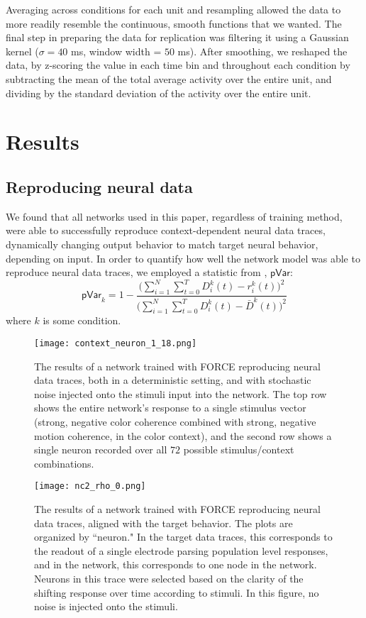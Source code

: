\documentclass[12pt,a4paper,final]{iopart}
\begin{document}
Averaging across conditions for each unit and resampling allowed the data to more readily resemble the continuous, smooth functions that we wanted. The final step in preparing the data for replication was filtering it using a Gaussian kernel ($\sigma = 40$ ms, window width = $50$ ms). After smoothing, we reshaped the data, by z-scoring the value in each time bin and throughout each condition by subtracting the mean of the total average activity over the entire unit, and dividing by the standard deviation of the activity over the entire unit.

\section{Results}
\label{sec:res}

\subsection{Reproducing neural data}
We found that all networks used in this paper, regardless of training method, were able to successfully reproduce context-dependent neural data traces, dynamically changing output behavior to match target neural behavior, depending on input. In order to quantify how well the network model was able to reproduce neural data traces, we employed a statistic from \cite{Rajan}, $\mathsf{pVar}$:
\[
    \mathsf{pVar}_k = 1 - \frac{\Big(\sum_{i = 1}^N \sum_{t = 0}^T D_i^k(t) - r_i^k(t)\Big)^2}{\Big(\sum_{i = 1}^N \sum_{t = 0}^T D_i^k(t) - \bar{D}^k(t)\Big)^2}
\]
where $k$ is some condition.
\begin{figure}[t]
 \centering
 \texttt{[image: context\_neuron\_1\_18.png]}
 \caption{The results of a network trained with FORCE reproducing neural data traces, both in a deterministic setting, and with stochastic noise injected onto the stimuli input into the network. The top row shows the entire network's response to a single stimulus vector (strong, negative color coherence combined with strong, negative motion coherence, in the color context), and the second row shows a single neuron recorded over all $72$ possible stimulus/context combinations.}
\end{figure}
\begin{figure}[t]
 \centering
 \texttt{[image: nc2\_rho\_0.png]}
 \caption{The results of a network trained with FORCE reproducing neural data traces, aligned with the target behavior. The plots are organized by ``neuron." In the target data traces, this corresponds to the readout of a single electrode parsing population level responses, and in the network, this corresponds to one node in the network. Neurons in this trace were selected based on the clarity of the shifting response over time according to stimuli. In this figure, no noise is injected onto the stimuli.}
\end{figure}
\end{document}
